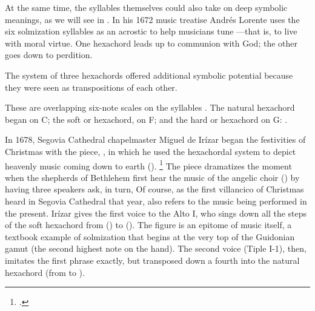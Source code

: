 At the same time, the syllables themselves could also take on deep symbolic
meanings, as we will see in .
In his 1672 music treatise Andrés Lorente uses the six solmization syllables as
an acrostic to help musicians tune ---that is, to live with moral virtue.%
    \Autocite[689]{Lorente:Porque}
One hexachord leads up to communion with God; the other goes down to perdition.


The system of three hexachords offered additional symbolic potential because
they were seen as transpositions of each other.%
\begin{Footnote}
    These are overlapping six-note scales on the syllables .
    The natural hexachord began on C; the soft or  hexachord, on
    F; and the hard or  hexachord on G:
    \Autocites{Judd:RenaissanceModalTheory}
    {Barnett:TonalOrganization17C}
    {Berger:Ficta}.
\end{Footnote}
In 1678, Segovia Cathedral chapelmaster Miguel de Irízar began the festivities
of Christmas with the  piece, , in
which he used the hexachordal system to depict heavenly music coming down to
earth ().%
    \footnote{.}
The piece dramatizes the moment when the shepherds of Bethlehem first hear the
music of the angelic choir () by having three speakers ask,
in turn,
Of course, as the first villancico of Christmas heard in Segovia Cathedral that
year,  also refers to the music being performed in
the present.
Irízar gives the first voice to the Alto I, who sings down all the steps of the
soft hexachord from  () to  ().
The figure is an epitome of music itself, a textbook example of solmization
that begins at the very top of the Guidonian gamut (the second highest note on
the hand).
The second voice (Tiple I-1), then, imitates the first phrase exactly, but
transposed down a fourth into the natural hexachord (from  to
).


